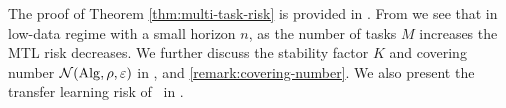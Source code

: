 The proof of Theorem \ref{thm:multi-task-risk} is provided in . 
%
From  we see that in low-data regime with a small horizon $n$, as the number of tasks $M$ increases the MTL risk decreases. We further discuss the stability factor $K$ and covering number $\mathcal{N}(\mathrm{Alg}, \rho, \varepsilon)$ in , and \ref{remark:covering-number}. We also present the transfer learning risk of \predt\ in .


